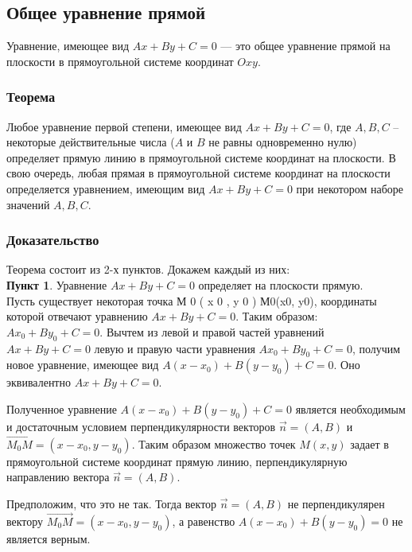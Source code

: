 \documentclass[12pt, fleqn]{extarticle}
\begin{document}
\subsection*{Общее уравнение прямой}

Уравнение, имеющее вид \(Ax + By + C = 0 \) — это общее уравнение прямой на плоскости в прямоугольной системе координат \(Oxy\).

\subsubsection*{Теорема}
Любое уравнение первой степени, имеющее вид \(Ax + By + C = 0\), где \(A, B, C\) – некоторые действительные числа (\(A\) и \(B\) не равны одновременно нулю) определяет прямую линию в прямоугольной системе координат на плоскости.
В свою очередь, любая прямая в прямоугольной системе координат на плоскости определяется уравнением, имеющим вид \(Ax + By + C = 0\) при некотором наборе значений \(A, B, C\).
\subsubsection*{Доказательство}
Теорема состоит из 2-х пунктов. Докажем каждый из них: \\

\textbf{Пункт 1}. Уравнение \(Ax + By + C = 0\) определяет на плоскости прямую. \\

Пусть существует некоторая точка М 0 ( x 0 ,   y 0 ) М0(x0, y0), координаты которой отвечают уравнению \(Ax + By + C = 0\). Таким образом: \(Ax_0 + By_0 + C = 0\).
Вычтем из левой и правой частей уравнений \(Ax + By + C = 0\) левую и правую части уравнения \(Ax_0 + By_0 + C = 0\), получим новое уравнение, имеющее вид \(A(x - x_0) + B(y - y_0) + C = 0\).
Оно эквивалентно \(Ax + By + C = 0\).

Полученное уравнение \(A(x - x_0) + B(y - y_0) + C = 0\) является необходимым и достаточным условием перпендикулярности векторов \(\overrightarrow{n} = (A, B)\) и \(\overrightarrow{M_0M} = (x - x_0, y - y_0)\).
Таким образом множество точек \(M(x, y)\) задает в прямоугольной системе координат прямую линию, перпендикулярную направлению вектора \(\overrightarrow{n} = (A, B)\).

Предположим, что это не так. Тогда вектор \(\overrightarrow{n} = (A, B)\) не перпендикулярен вектору \(\overrightarrow{M_0M} = (x - x_0, y - y_0)\), а равенство \(A(x - x_0) + B(y - y_0) = 0\) не является верным.
\end{document}
